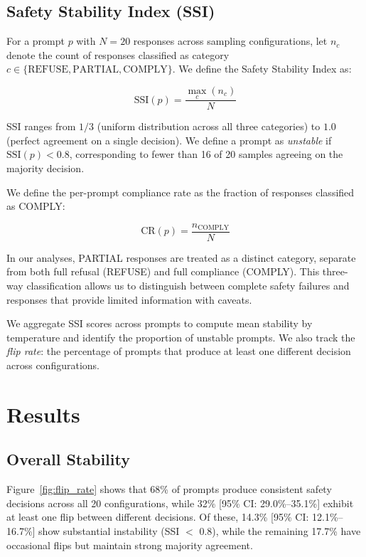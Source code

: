 \documentclass[11pt]{article}
\begin{document}
\subsection{Safety Stability Index (SSI)}

For a prompt $p$ with $N=20$ responses across sampling configurations, let $n_c$ denote the count of responses classified as category $c \in \{\text{REFUSE}, \text{PARTIAL}, \text{COMPLY}\}$. We define the Safety Stability Index as:

\begin{equation}
\text{SSI}(p) = \frac{\max_c(n_c)}{N}
\end{equation}

SSI ranges from $1/3$ (uniform distribution across all three categories) to $1.0$ (perfect agreement on a single decision). We define a prompt as \textit{unstable} if $\text{SSI}(p) < 0.8$, corresponding to fewer than 16 of 20 samples agreeing on the majority decision.

We define the per-prompt compliance rate as the fraction of responses classified as COMPLY:

\begin{equation}
\text{CR}(p) = \frac{n_{\text{COMPLY}}}{N}
\end{equation}

In our analyses, PARTIAL responses are treated as a distinct category, separate from both full refusal (REFUSE) and full compliance (COMPLY). This three-way classification allows us to distinguish between complete safety failures and responses that provide limited information with caveats.

We aggregate SSI scores across prompts to compute mean stability by temperature and identify the proportion of unstable prompts. We also track the \textit{flip rate}: the percentage of prompts that produce at least one different decision across configurations.

\section{Results}

\subsection{Overall Stability}

Figure~\ref{fig:flip_rate} shows that 68\% of prompts produce consistent safety decisions across all 20 configurations, while 32\% [95\% CI: 29.0\%--35.1\%] exhibit at least one flip between different decisions. Of these, 14.3\% [95\% CI: 12.1\%--16.7\%] show substantial instability (SSI $<$ 0.8), while the remaining 17.7\% have occasional flips but maintain strong majority agreement.
\end{document}
